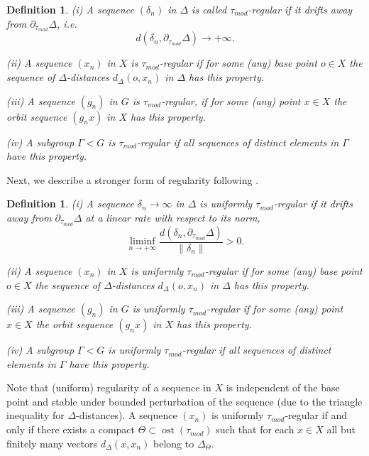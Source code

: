 \documentclass[12pt]{article}
\theoremstyle{boldplain}
\theoremstyle{bolddefinition}
\newtheorem{dfn}[equation]{Definition}
\numberwithin{equation}{section}
\def\Ga{\Gamma}
\def\de{\delta}
\def\De{\Delta}
\def\Dt{\partial_{\tau_{mod}}}
\def\ost{\operatorname{ost}}
\def\taumod{\tau_{mod}}
\begin{document}
\begin{dfn}
(i) A sequence $(\de_n)$ in $\De$ is called 
 {\em $\taumod$-regular} if it drifts away from $\Dt\De$, i.e. 
$$ d(\de_n,\Dt\De) \to+\infty .$$

(ii) A sequence $(x_n)$ in $X$ is {\em $\taumod$-regular} 
if for some (any) base point $o\in X$ the sequence of $\De$-distances $d_{\De}(o,x_n)$ in $\De$
has this property.

(iii) A sequence $(g_n)$ in $G$ is {\em $\taumod$-regular}, 
if for some (any) point $x\in X$ the orbit sequence $(g_nx)$ in $X$ has this property.

(iv) A subgroup $\Ga<G$ is {\em $\taumod$-regular}
if all sequences of distinct elements in $\Ga$ have this property.
\end{dfn}

Next, we describe a stronger form of regularity following \cite[\S 4.6]{anolec}.  


\begin{dfn}
\label{def:unifreg}
(i) A sequence $\de_n\to\infty$ in $\De$ is 
{\em uniformly $\taumod$-regular} if it drifts away from $\Dt\De$
at a linear rate with respect to 
its norm,
$$ \liminf_{n\to+\infty} \frac{d(\de_n,\Dt\De)}{\|\de_n\|} > 0.$$

(ii) A sequence $(x_n)$ in $X$ is {\em uniformly $\taumod$-regular}
if for some (any) base point $o\in X$ the sequence of $\De$-distances $d_{\De}(o,x_n)$ in $\De$
has this property.

(iii) A sequence $(g_n)$ in $G$ is {\em uniformly $\taumod$-regular}
if for some (any) point $x\in X$ the orbit sequence $(g_nx)$ in $X$ has this property.

(iv) A subgroup $\Ga<G$ is {\em uniformly $\taumod$-regular}
if all sequences of distinct elements in $\Ga$ have this property.
\end{dfn}


Note that (uniform) regularity of a sequence in $X$ 
is independent of the base point and stable under bounded perturbation of the sequence 
(due to the triangle inequality for $\De$-distances). A sequence $(x_n)$ is uniformly $\taumod$-regular if and only if there exists a compact $\Theta\subset \ost(\taumod)$ such that for each 
$x\in X$ all but finitely many vectors $d_\De(x, x_n)$ belong to $\Delta_\Theta$. 
\end{document}
